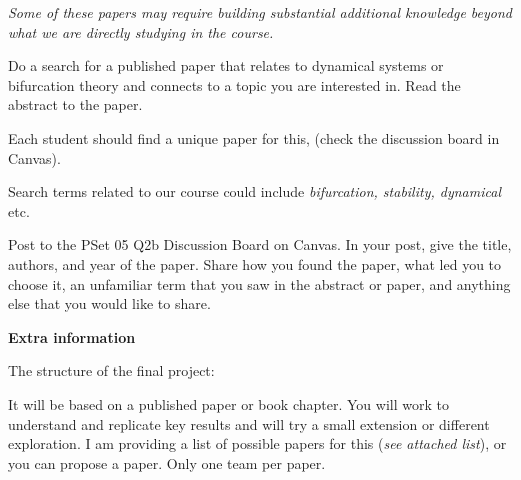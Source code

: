 \documentclass[12pt,letterpaper,answers]{exam}
\begin{document}
\begin{questions}
\begin{parts}
\emph{Some of these papers may require building substantial additional knowledge beyond what we are directly studying in the course.}


\item Do a search for a published paper that relates to dynamical systems or bifurcation theory and connects to a topic you are interested in.  Read the abstract to the paper.  
    
Each student should find a unique paper for this, (check the discussion board in Canvas).
    
Search terms related to our course could include \emph{bifurcation, stability, dynamical} etc.

Post to the PSet 05 Q2b Discussion Board on Canvas.  In your post, give the title, authors, and year of the paper.  Share how you found the paper, what led you to choose it, an unfamiliar term that you saw in the abstract or paper, and anything else that you would like to share.

\end{parts}  

  



\textbf{Extra information}

The structure of the final project:

 It will be based on a published paper or book chapter.  You will work to understand and replicate key results and will try a small extension or different exploration. %
 I am providing a list of possible papers for this (\emph{see attached list}), or you can propose a paper.  Only one team per paper.





\end{questions}
\end{document}
